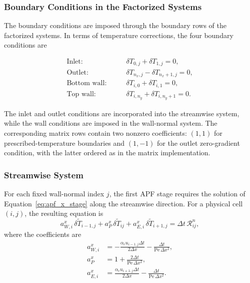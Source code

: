 \subsubsection{Boundary Conditions in the Factorized Systems}

The boundary conditions are imposed through the boundary rows
of the factorized systems. In terms of temperature corrections,
the four boundary conditions are

\begin{align}
\text{Inlet:}\qquad
&\delta T_{0,j}+\delta T_{1,j}=0,
\\
\text{Outlet:}\qquad
&\delta T_{n_x,j}-\delta T_{n_x+1,j}=0,
\\
\text{Bottom wall:}\qquad
&\delta T_{i,0}+\delta T_{i,1}=0,
\\
\text{Top wall:}\qquad
&\delta T_{i,n_y}+\delta T_{i,n_y+1}=0.
\end{align}

The inlet and outlet conditions are incorporated into the
streamwise system, while the wall conditions are imposed in the
wall-normal system. The corresponding matrix rows contain two
nonzero coefficients: $(1,1)$ for prescribed-temperature
boundaries and $(1,-1)$ for the outlet zero-gradient condition,
with the latter ordered as in the matrix implementation.

\subsubsection{Streamwise System}

For each fixed wall-normal index $j$, the first APF stage
requires the solution of
Equation~\eqref{eq:apf_x_stage} along the streamwise direction.
For a physical cell $(i,j)$, the resulting equation is
\begin{equation}
\boxed{
a^x_{W,i}\,
\delta\widetilde{T}_{i-1,j}
+
a^x_P\,
\delta\widetilde{T}_{ij}
+
a^x_{E,i}\,
\delta\widetilde{T}_{i+1,j}
=
\Delta t\,\mathcal{R}_{ij}^{n},
}
\label{eq:apf_x_tridiagonal}
\end{equation}
where the coefficients are
\begin{align}
a^x_{W,i}
&=
-\frac{\alpha_c u_{i-1,j}\Delta t}{2\Delta x}
-\frac{\Delta t}{\mathrm{Pe}\,\Delta x^2},
\label{eq:apf_x_west}
\\[0.15cm]
a^x_P
&=
1+\frac{2\Delta t}{\mathrm{Pe}\,\Delta x^2},
\label{eq:apf_x_center}
\\[0.15cm]
a^x_{E,i}
&=
\frac{\alpha_c u_{i+1,j}\Delta t}{2\Delta x}
-\frac{\Delta t}{\mathrm{Pe}\,\Delta x^2}.
\label{eq:apf_x_east}
\end{align}

